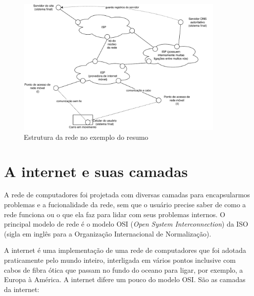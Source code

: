 \documentclass[brazilian,a4paper,twocolumn]{article}
\begin{document}
\begin{figure}
    \centering
    \includegraphics[width=0.9\textwidth]{prova1-figura-estrutura.pdf}
    \caption{Estrutura da rede no exemplo do resumo}
    \label{fig-estrutura-resumo}
\end{figure}


\section{A internet e suas camadas}

A rede de computadores foi projetada com diversas camadas para encapsularmos problemas e a fucionalidade da rede, sem que o usuário precise saber de como a rede funciona ou o que ela faz para lidar com seus problemas internos. O principal modelo de rede é o modelo OSI (\textit{Open System Interconnection}) da ISO (sigla em inglês para a Organização Internacional de Normalização).

A internet é uma implementação de uma rede de computadores que foi adotada praticamente pelo mundo inteiro, interligada em vários pontos inclusive com cabos de fibra ótica que passam no fundo do oceano para ligar, por exemplo, a Europa à América. A internet difere um pouco do modelo OSI. São as camadas da internet:
\end{document}
